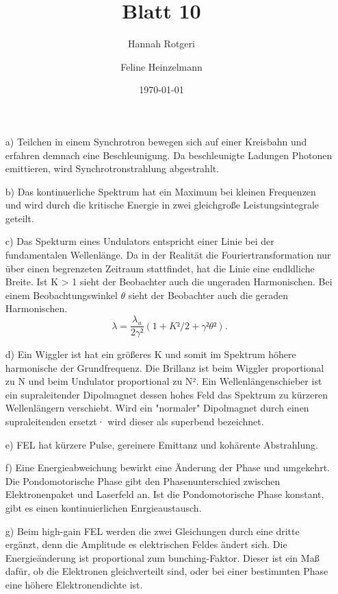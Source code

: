 \documentclass[11pt,a4paper]{article}
\title{Blatt 10}
\date{\today}
\author{Hannah Rotgeri \and Feline Heinzelmann}
\begin{document}
    \maketitle


	\begin{itemize}
		\item[a)] 
			Teilchen in einem Synchrotron bewegen sich auf einer Kreisbahn
			und erfahren demnach eine Beschleunigung.
			Da beschleunigte Ladungen Photonen emittieren,
			wird Synchrotronstrahlung abgestrahlt.

		\item[b)]
			Das kontinuerliche Spektrum hat ein Maximum bei kleinen Frequenzen und 
			wird durch die kritische Energie in zwei gleichgroße Leistungsintegrale geteilt.

		\item[c)] 
			Das Spekturm eines Undulators entspricht einer Linie bei der fundamentalen Wellenlänge.
			Da in der Realität die Fouriertransformation nur über einen begrenzeten Zeitraum stattfindet,
			hat die Linie eine endldliche Breite.
			Ist K > 1 sieht der Beobachter auch die ungeraden Harmonischen.
			Bei einem Beobachtungswinkel $\theta$ sieht der Beobachter auch die geraden Harmonischen.
			\begin{equation}
				\lambda = \frac{\lambda_u}{2 \gamma ²} (1 + K²/2 + \gamma² \theta²).
			\end{equation}

		\item[d)]
			Ein Wiggler ist hat ein größeres K und somit im Spektrum höhere harmonische der Grundfrequenz.
			Die Brillanz ist beim Wiggler proportional zu N und beim Undulator proportional zu N².
			Ein Wellenlängenschieber ist ein supraleitender Dipolmagnet dessen hohes Feld das Spektrum zu kürzeren Wellenlängern verschiebt.
			Wird ein "normaler" Dipolmagnet durch einen supraleitenden ersetzt· wird dieser als superbend bezeichnet.

		\item[e)]
			FEL hat kürzere Pulse, gereinere Emittanz und kohärente Abstrahlung.
		
		\item[f)]
			Eine Energieabweichung bewirkt eine Änderung der Phase und umgekehrt.
			Die Pondomotorische Phase gibt den Phasenunterschied zwischen Elektronenpaket und Laserfeld an.
			Ist die Pondomotorische Phase konstant, gibt es einen kontinuierlichen Enrgieaustausch.
		
		\item[g)]
			Beim high-gain FEL werden die zwei Gleichungen durch eine dritte ergänzt,
			denn die Amplitude es elektrischen Feldes ändert sich.
			Die Energieänderung ist proportional zum bunching-Faktor.
			Dieser ist ein Maß dafür, ob die Elektronen gleichverteilt sind,
			oder bei einer bestimmten Phase eine höhere Elektronendichte ist.
		

\end{itemize}
\end{document}
